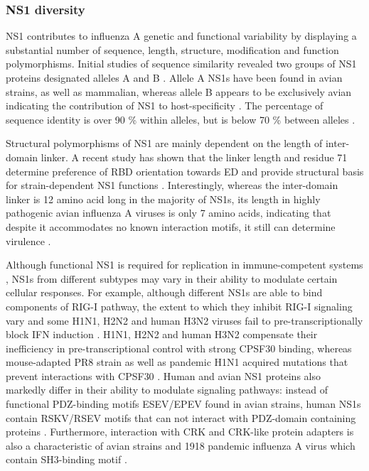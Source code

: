 		
		
		\subsubsection{NS1 diversity}
		
		NS1 contributes to influenza A genetic and functional variability by displaying a substantial number of sequence, length, structure, modification and function polymorphisms. Initial studies of sequence similarity revealed two groups of \gls{NS1} proteins designated alleles A and B \parencite{Scholtissek1980}. Allele A \gls{NS1}s have been found in avian strains, as well as mammalian, whereas allele B appears to be exclusively avian indicating the contribution of NS1 to host-specificity \parencite{Treanor1989, Ludwig1991}. The percentage of sequence identity is over 90 \% within alleles, but is below 70 \% between alleles \parencite{Scholtissek1980}.
		
		Structural polymorphisms of \gls{NS1} are mainly dependent on the length of inter-domain linker. A recent study has shown that the linker length and residue 71 determine preference of \gls{RBD} orientation towards \gls{ED} and provide structural basis for strain-dependent \gls{NS1} functions \parencite{Carrillo2014}. Interestingly, whereas the inter-domain linker is 12 amino acid long in the majority of \gls{NS1}s, its length in highly pathogenic avian influenza A viruses is only 7 amino acids, indicating that despite it accommodates no known interaction motifs, it still can determine virulence \parencite{Long2008}.
		
		Although functional \gls{NS1} is required for replication in immune-competent systems \parencite{Garcia-Sastre1998, Donelan2003}, \gls{NS1}s from different subtypes may vary in their ability to modulate certain cellular responses. For example, although different \gls{NS1}s are able to bind components of \gls{RIG-I} pathway, the extent to which they inhibit \gls{RIG-I} signaling vary and some H1N1, H2N2 and human H3N2 viruses fail to pre-transcriptionally block \gls{IFN} induction \parencite{Kochs2007, Haye2009, Munir2011a, Munir2012}. H1N1, H2N2 and human H3N2 compensate their inefficiency in pre-transcriptional control with strong \gls{CPSF}30 binding, whereas mouse-adapted PR8 strain as well as pandemic H1N1 acquired mutations that prevent interactions with \gls{CPSF}30 \parencite{Kochs2007, Hale2010d}. Human and avian \gls{NS1} proteins also markedly differ in their ability to modulate signaling pathways: instead of functional PDZ-binding motifs ESEV/EPEV found in avian strains, human NS1s contain RSKV/RSEV motifs that can not interact with PDZ-domain containing proteins \parencite{Liu2010}. Furthermore, interaction with CRK and CRK-like protein adapters is also a characteristic of avian strains and 1918 pandemic influenza A virus which contain SH3-binding motif \parencite{Heikkinen2008}.
		
